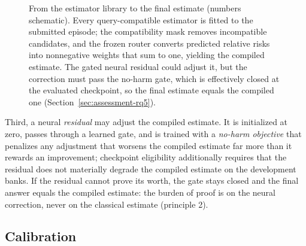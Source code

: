 \documentclass[electronics,article,submit,oneauthor]{Definitions/mdpi}
\providecommand{\Tiny}{\fontsize{6}{7}\selectfont}
\begin{document}
\begin{figure}[!t]
\caption{From the estimator library to the final estimate (numbers schematic). Every query-compatible estimator is fitted to the submitted episode; the compatibility mask removes incompatible candidates, and the frozen router converts predicted relative risks into nonnegative weights that sum to one, yielding the compiled estimate. The gated neural residual could adjust it, but the correction must pass the no-harm gate, which is effectively closed at the evaluated checkpoint, so the final estimate equals the compiled one (Section~\ref{sec:assessment-rq5}).}
\label{fig:router}
\end{figure}

Third, a neural \emph{residual} may adjust the compiled estimate. It is initialized at zero, passes through a learned gate, and is trained with a \emph{no-harm objective} that penalizes any adjustment that worsens the compiled estimate far more than it rewards an improvement; checkpoint eligibility additionally requires that the residual does not materially degrade the compiled estimate on the development banks. If the residual cannot prove its worth, the gate stays closed and the final answer equals the compiled estimate: the burden of proof is on the neural correction, never on the classical estimate (principle 2).

\subsection{Calibration}\label{sec:approach-calibration}
\end{document}
